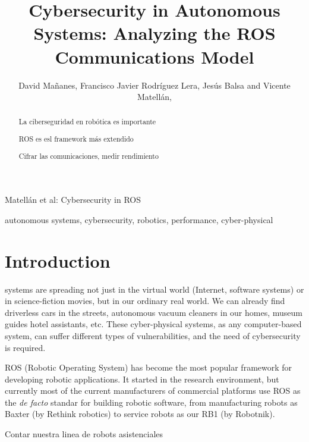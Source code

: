 \documentclass[journal,twoside]{JoPhA}
\begin{document}
\title{Cybersecurity in Autonomous Systems: Analyzing the ROS Communications Model}

\author{David Ma\~nanes, Francisco Javier Rodr\'iguez Lera, Jes\'us Balsa and Vicente Matell\'an,
}


%
{Matell\'an et al: Cybersecurity in ROS}
\maketitle


\begin{abstract}
La ciberseguridad en robótica es importante

ROS es esl framework más extendido

Cifrar las comunicaciones, medir rendimiento
\end{abstract}


\begin{IEEEkeywords}
autonomous systems, cybersecurity, robotics, performance, cyber-physical
\end{IEEEkeywords}


\section{Introduction}

 systems are spreading not just in the virtual world (Internet, software systems) or in science-fiction movies, but in our ordinary real world. We can already find driverless cars in the streets, autonomous vacuum cleaners in our homes, museum guides hotel assistants, etc. These cyber-physical systems, as any computer-based system, can suffer different types of vulnerabilities, and the  need of cybersecurity \cite{Morante2015} is required. 

ROS (Robotic Operating System) \cite{ROS09} has become the most popular framework for developing robotic applications. It started in the research environment, but currently most of the current manufacturers of commercial platforms use ROS as the {\em de facto} standar for building robotic software, from manufacturing robots as Baxter (by Rethink robotics) to service robots as our RB1 (by Robotnik).

Contar nuestra linea de robots asistenciales \cite{lera}
\end{document}

